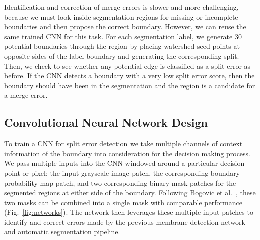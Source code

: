 Identification and correction of merge errors is slower and more challenging, because we must look inside segmentation regions for missing or incomplete boundaries and then propose the correct boundary. However, we can reuse the same trained CNN for this task. For each segmentation label, we generate 30 potential boundaries through the region by placing watershed seed points at opposite sides of the label boundary and generating the corresponding split. Then, we check to see whether any potential edge is classified as a split error as before. If the CNN detects a boundary with a very low split error score, then the boundary should have been in the segmentation and the region is a candidate for a merge error.







\subsection{Convolutional Neural Network Design}
To train a CNN for split error detection we take multiple channels of context information of the boundary into consideration for the decision making process. We pass multiple inputs into the CNN windowed around a particular decision point or pixel: the input grayscale image patch, the corresponding boundary probability map patch, and two corresponding binary mask patches for the segmented regions at either side of the boundary. Following Bogovic et al.~\cite{BogovicHJ13}, these two masks can be combined into a single mask with comparable performance (Fig.~\ref{fig:networks}). The network then leverages these multiple input patches to identify and correct errors made by the previous membrane detection network and automatic segmentation pipeline.

